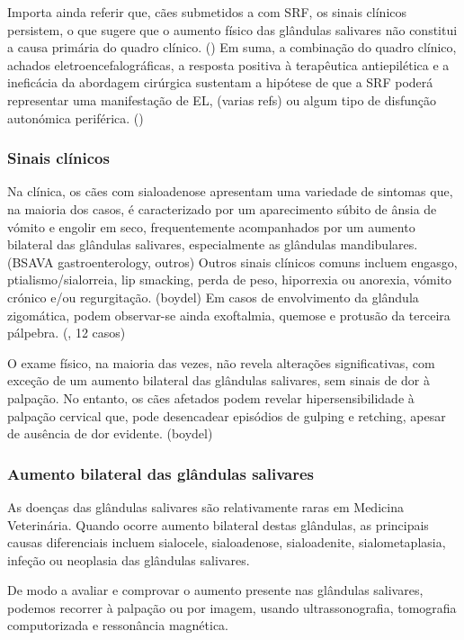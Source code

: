 Importa ainda referir que, cães submetidos a \cite{Swieton2022} com SRF, os sinais clínicos persistem, o que sugere que o aumento físico das glândulas salivares não constitui a causa primária do quadro clínico. (\cite{Kalayanakoul2019}) 
Em suma, a combinação do quadro clínico, achados eletroencefalográficas, a resposta positiva à terapêutica antiepilética e a ineficácia da abordagem cirúrgica sustentam a hipótese de que a SRF poderá representar uma manifestação de EL, (varias refs) ou algum tipo de disfunção autonómica periférica. (\cite{alemao})


\subsubsection{Sinais clínicos} 

Na clínica, os cães com sialoadenose apresentam uma variedade de sintomas que, na maioria dos casos, é caracterizado por um aparecimento súbito de ânsia de vómito e engolir em seco, frequentemente acompanhados por um aumento bilateral das glândulas salivares, especialmente as glândulas mandibulares. (BSAVA gastroenterology, outros) Outros sinais clínicos comuns incluem engasgo,  ptialismo/sialorreia, lip smacking, perda de peso, hiporrexia ou anorexia, vómito crónico e/ou regurgitação. (boydel) Em casos de envolvimento da glândula zigomática, podem observar-se ainda exoftalmia, quemose e protusão da terceira pálpebra. (\cite{Park2022}, 12 casos) 


O exame físico, na maioria das vezes, não revela alterações significativas, com exceção de um aumento bilateral das glândulas salivares, sem sinais de dor à palpação. No entanto, os cães afetados podem revelar hipersensibilidade à palpação cervical que, pode desencadear episódios de gulping e retching, apesar de ausência de dor evidente. (boydel)

\subsubsection{Aumento bilateral das glândulas salivares} 

As doenças das glândulas salivares são relativamente raras em Medicina Veterinária. Quando ocorre aumento bilateral destas glândulas, as principais causas diferenciais incluem sialocele, sialoadenose, sialoadenite, sialometaplasia, infeção ou neoplasia das glândulas salivares.


De modo a avaliar e comprovar o aumento presente nas glândulas salivares, podemos recorrer à palpação ou por imagem, usando ultrassonografia, tomografia computorizada e ressonância magnética.

